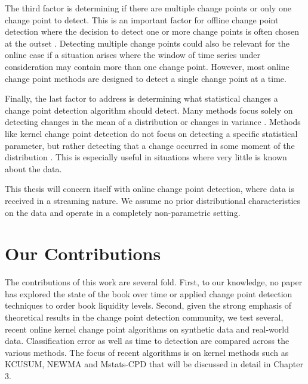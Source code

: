 
The third factor is determining if there are multiple change points or only one change point to detect. This is an important  factor for offline change point detection where the decision to detect one or more change points is often chosen at the outset \cite{jandhyala2013inference}.  Detecting multiple change points could also be relevant for the online case if a situation arises where the window of time series under consideration may contain more than one change point. However, most online change point methods are designed to detect a single change point at a time.

Finally, the last factor to address is determining what statistical changes a change point detection algorithm should detect. Many methods focus solely on detecting changes in the mean of a distribution \cite{lee2010change} or changes in variance \cite{hawkins2005change} \cite{inclan1994use}. Methods like kernel change point detection do not focus on detecting a specific statistical parameter, but rather detecting that a change occurred in some moment of the distribution \cite{arlot2012kernel}. This is especially useful in situations where very little is known about the data.

This thesis will concern itself with online change point detection, where data is received in a streaming nature. We assume no prior distributional characteristics on the data and operate in a completely non-parametric setting. 


\section{Our Contributions}
The contributions of this work are several fold. First, to our knowledge, no paper has explored the state of the book over time or applied change point detection techniques to order book liquidity levels. Second, given the strong emphasis of theoretical results in the change point detection community, we test several, recent online kernel change point algorithms on synthetic data and real-world data. Classification error as well as time to detection are compared across the various methods. The focus of recent algorithms is on kernel methods such as KCUSUM, NEWMA and Mstats-CPD that will be discussed in detail in Chapter 3.

